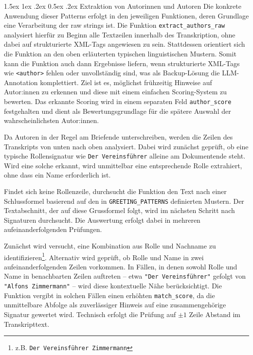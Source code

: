 \documentclass[12pt, a4paper, ngerman, bidi=default]{article}
\makeatletter
\newcommand{\code}[1]{\colorbox{VeryLightGray}{\texttt{#1}}} %
\let\oldparagraph\paragraph%
\renewcommand{\paragraph}{
    \@ifstar%
      \xxxParagraphStar%
      \xxxParagraphNoStar%
 }
\newcommand{\xxxParagraphStar}[1]{\oldparagraph*{#1}\mbox{}}
\newcommand{\xxxParagraphNoStar}[1]{\oldparagraph{#1}\mbox{}}
\renewcommand\paragraph{\@startsection{paragraph}{4}{0em}%
  {1.5ex \@plus1ex \@minus.2ex}%
  {0.5ex \@plus.2ex}%
  {\normalfont\normalsize\bfseries\itshape}}
\makeatother
\begin{document}
\paragraph{Extraktion von Autorinnen und Autoren}
Die konkrete Anwendung dieser Patterns erfolgt in den jeweiligen Funktionen, deren Grundlage eine Verarbeitung der raw strings ist. Die Funktion \code{extract\_authors\_raw} analysiert hierfür zu Beginn alle Textzeilen innerhalb des Transkription, ohne dabei auf strukturierte XML-Tags angewiesen zu sein. Stattdessen orientiert sich die Funktion an den oben erläuterten typischen linguistischen Mustern. Somit kann die Funktion auch dann Ergebnisse liefern, wenn strukturierte XML-Tags wie \code{<author>} fehlen oder unvollständig sind, was als Backup-Lösung die LLM-Annotation komplettiert. Ziel ist es, möglichst frühzeitig Hinweise auf Autor:innen zu erkennen und diese mit einem einfachen Scoring-System zu bewerten. Das erkannte Scoring wird in einem separaten Feld \code{author\_score} festgehalten und dient als Bewertungsgrundlage für die spätere Auswahl der wahrscheinlichsten Autor:innen.

Da Autoren in der Regel am Briefende unterschreiben, werden die Zeilen des Transkripts von unten nach oben analysiert. Dabei wird zunächst geprüft, ob eine typische Rollensignatur wie \texttt{Der Vereinsführer} alleine am Dokumentende steht. Wird eine solche erkannt, wird unmittelbar eine entsprechende Rolle extrahiert, ohne dass ein Name erforderlich ist.

Findet sich keine Rollenzeile, durchsucht die Funktion den Text nach einer Schlussformel basierend auf den in \code{GREETING\_PATTERNS} definierten Mustern. Der Textabschnitt, der auf diese Grussformel folgt, wird im nächsten Schritt nach Signaturen durchsucht. Die Auswertung erfolgt dabei in mehreren aufeinanderfolgenden Prüfungen.

Zunächst wird versucht, eine Kombination aus Rolle und Nachname zu identifizieren\footnote{z.B. \texttt{Der Vereinsführer Zimmermann}}.
Alternativ wird geprüft, ob Rolle und Name in zwei aufeinanderfolgenden Zeilen vorkommen. In Fällen, in denen sowohl Rolle und Name in benachbarten Zeilen auftreten – etwa \texttt{"Der Vereinsführer"} gefolgt von \texttt{"Alfons Zimmermann"} – wird diese kontextuelle Nähe berücksichtigt. Die Funktion vergibt in solchen Fällen einen erhöhten \code{match\_score}, da die unmittelbare Abfolge als zuverlässiger Hinweis auf eine zusammengehörige Signatur gewertet wird. Technisch erfolgt die Prüfung auf $\pm1$ Zeile Abstand im Transkripttext.\\
\end{document}
